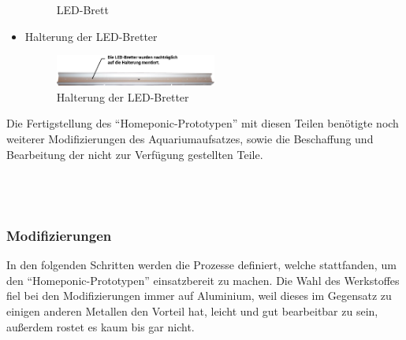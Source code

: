 \begin{itemize}
\begin{figure}[ht]
	   \caption{LED-Brett}
    \end{figure}
    \item{Halterung der \gls{LED}-Bretter}\mbox{} \\
    \begin{figure}[ht]
        \centering
        \includegraphics[width=0.5\textwidth]{images/LED-Halterung}
	    \caption{Halterung der LED-Bretter}
    \end{figure}
\end{itemize}

Die Fertigstellung des "`Homeponic-Prototypen"' mit diesen Teilen benötigte noch weiterer Modifizierungen des Aquariumaufsatzes, sowie die Beschaffung und Bearbeitung der nicht zur Verfügung gestellten Teile.\mbox{} \\
\mbox{} \\
\mbox{} \\
\mbox{} \\
\newpage
\subsubsection{Modifizierungen}
In den folgenden Schritten werden die Prozesse definiert, welche stattfanden, um den "`Homeponic-Prototypen"' einsatzbereit zu machen. Die Wahl des Werkstoffes fiel bei den Modifizierungen immer auf Aluminium, weil dieses im Gegensatz zu einigen anderen Metallen den Vorteil hat, leicht und gut bearbeitbar zu sein, außerdem rostet es kaum bis gar nicht.\\

